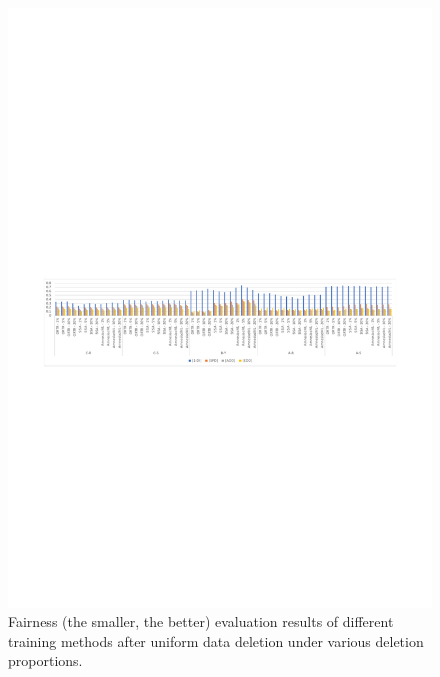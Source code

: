 \begin{figure}[t!]
  \centering
  \includegraphics[width=1.0\textwidth]{assets/rq2-bar-chart.pdf}
  \caption{Fairness (the smaller, the better) evaluation results of different training methods after uniform data deletion under various deletion proportions.}
  \label{fig:rq2-bar-chart}
\end{figure}

